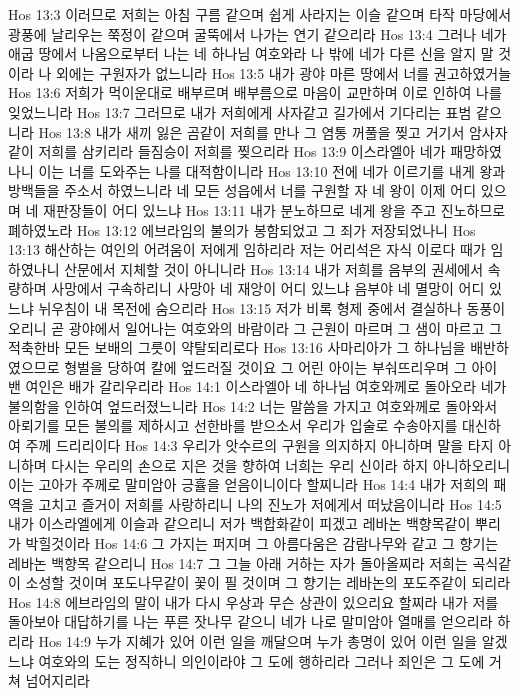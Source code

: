 Hos 13:3  이러므로 저희는 아침 구름 같으며 쉽게 사라지는 이슬 같으며 타작 마당에서 광풍에 날리우는 쭉정이 같으며 굴뚝에서 나가는 연기 같으리라
Hos 13:4  그러나 네가 애굽 땅에서 나옴으로부터 나는 네 하나님 여호와라 나 밖에 네가 다른 신을 알지 말 것이라 나 외에는 구원자가 없느니라
Hos 13:5  내가 광야 마른 땅에서 너를 권고하였거늘
Hos 13:6  저희가 먹이운대로 배부르며 배부름으로 마음이 교만하며 이로 인하여 나를 잊었느니라
Hos 13:7  그러므로 내가 저희에게 사자같고 길가에서 기다리는 표범 같으니라
Hos 13:8  내가 새끼 잃은 곰같이 저희를 만나 그 염통 꺼풀을 찢고 거기서 암사자같이 저희를 삼키리라 들짐승이 저희를 찢으리라
Hos 13:9  이스라엘아 네가 패망하였나니 이는 너를 도와주는 나를 대적함이니라
Hos 13:10  전에 네가 이르기를 내게 왕과 방백들을 주소서 하였느니라 네 모든 성읍에서 너를 구원할 자 네 왕이 이제 어디 있으며 네 재판장들이 어디 있느냐
Hos 13:11  내가 분노하므로 네게 왕을 주고 진노하므로 폐하였노라
Hos 13:12  에브라임의 불의가 봉함되었고 그 죄가 저장되었나니
Hos 13:13  해산하는 여인의 어려움이 저에게 임하리라 저는 어리석은 자식 이로다 때가 임하였나니 산문에서 지체할 것이 아니니라
Hos 13:14  내가 저희를 음부의 권세에서 속량하며 사망에서 구속하리니 사망아 네 재앙이 어디 있느냐 음부야 네 멸망이 어디 있느냐 뉘우침이 내 목전에 숨으리라
Hos 13:15  저가 비록 형제 중에서 결실하나 동풍이 오리니 곧 광야에서 일어나는 여호와의 바람이라 그 근원이 마르며 그 샘이 마르고 그 적축한바 모든 보배의 그릇이 약탈되리로다
Hos 13:16  사마리아가 그 하나님을 배반하였으므로 형벌을 당하여 칼에 엎드러질 것이요 그 어린 아이는 부숴뜨리우며 그 아이 밴 여인은 배가 갈리우리라
Hos 14:1  이스라엘아 네 하나님 여호와께로 돌아오라 네가 불의함을 인하여 엎드러졌느니라
Hos 14:2  너는 말씀을 가지고 여호와께로 돌아와서 아뢰기를 모든 불의를 제하시고 선한바를 받으소서 우리가 입술로 수송아지를 대신하여 주께 드리리이다
Hos 14:3  우리가 앗수르의 구원을 의지하지 아니하며 말을 타지 아니하며 다시는 우리의 손으로 지은 것을 향하여 너희는 우리 신이라 하지 아니하오리니 이는 고아가 주께로 말미암아 긍휼을 얻음이니이다 할찌니라
Hos 14:4  내가 저희의 패역을 고치고 즐거이 저희를 사랑하리니 나의 진노가 저에게서 떠났음이니라
Hos 14:5  내가 이스라엘에게 이슬과 같으리니 저가 백합화같이 피겠고 레바논 백향목같이 뿌리가 박힐것이라
Hos 14:6  그 가지는 퍼지며 그 아름다움은 감람나무와 같고 그 향기는 레바논 백향목 같으리니
Hos 14:7  그 그늘 아래 거하는 자가 돌아올찌라 저희는 곡식같이 소성할 것이며 포도나무같이 꽃이 필 것이며 그 향기는 레바논의 포도주같이 되리라
Hos 14:8  에브라임의 말이 내가 다시 우상과 무슨 상관이 있으리요 할찌라 내가 저를 돌아보아 대답하기를 나는 푸른 잣나무 같으니 네가 나로 말미암아 열매를 얻으리라 하리라
Hos 14:9  누가 지혜가 있어 이런 일을 깨달으며 누가 총명이 있어 이런 일을 알겠느냐 여호와의 도는 정직하니 의인이라야 그 도에 행하리라 그러나 죄인은 그 도에 거쳐 넘어지리라


